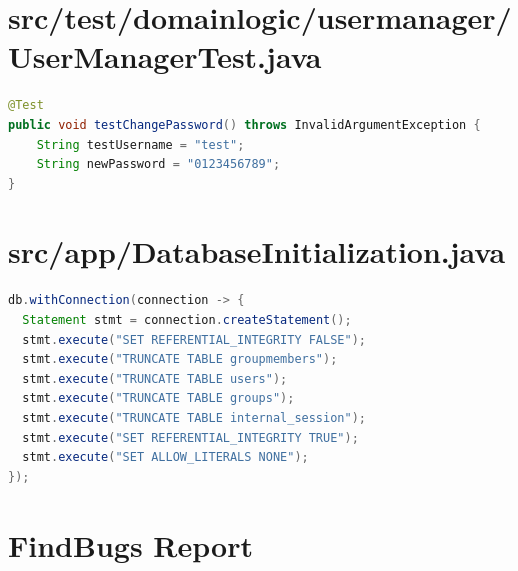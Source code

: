\documentclass[12pt,DIV14,BCOR10mm,a4paper,parskip=half-,headsepline,headinclude,english,ngerman,bibliography=totocnumbered]{scrreprt}
\begin{document}
\printacronyms[title=Abkürzungsverzeichnis,toctitle=Abkürzungsverzeichnis]
\printglossary[type=main]

\listoffigures      %


\begin{appendices}

\chapter{src/test/domainlogic/\allowbreak usermanager/UserManagerTest.java}
\begin{lstlisting}[language=Java,caption=Hardkodiertes Passwort in einem Test aus der Klasse \texttt{UserManagerTest},label={lst:staticanalysis-hardcoded-pw}]
@Test
public void testChangePassword() throws InvalidArgumentException {
    String testUsername = "test";
    String newPassword = "0123456789";
}
\end{lstlisting}

\chapter{src/app/DatabaseInitialization.java}
\begin{lstlisting}[language=Java,caption=Von SecureAssist gefundenes False Positive Beispiel für Query Injections,label={lst:staticanalysis-query-injection}]
db.withConnection(connection -> {
  Statement stmt = connection.createStatement();
  stmt.execute("SET REFERENTIAL_INTEGRITY FALSE");
  stmt.execute("TRUNCATE TABLE groupmembers");
  stmt.execute("TRUNCATE TABLE users");
  stmt.execute("TRUNCATE TABLE groups");
  stmt.execute("TRUNCATE TABLE internal_session");
  stmt.execute("SET REFERENTIAL_INTEGRITY TRUE");
  stmt.execute("SET ALLOW_LITERALS NONE");
});
\end{lstlisting}

\chapter{FindBugs Report}
\label{staticanalysis-find-bugs}
%

\end{appendices}
\end{document}
